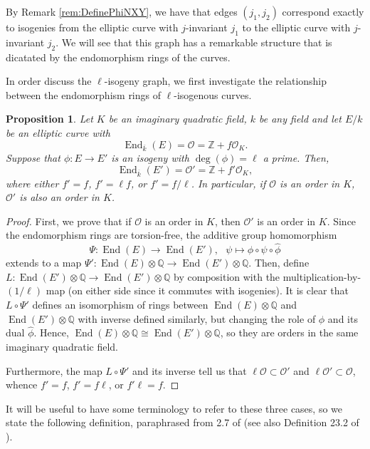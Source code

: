 \documentclass{amsart}
\newtheorem{prop}[thm]{Proposition}
\theoremstyle{definition}
\theoremstyle{remark}
\numberwithin{equation}{section}
\newcommand{\cO}{\mathcal O}
\newcommand{\bbQ}{\mathbb Q}
\newcommand{\bbZ}{\mathbb Z}
\DeclareMathOperator{\End}{End}
\begin{document}
 By Remark \ref{rem:DefinePhiNXY}, we have that edges $(j_{1}, j_{2})$ correspond exactly to isogenies from the elliptic curve with $j$-invariant $j_{1}$ to the elliptic curve with $j$-invariant $j_{2}$. We will see that this graph has a remarkable structure that is dicatated by the endomorphism rings of the curves. 
 
 In order discuss the $\ell$-isogeny graph, we first investigate the relationship between the endomorphism rings of $\ell$-isogenous curves. 
 
 \begin{prop} \label{prop:IsogeniesAffectEndRing}
 Let $K$ be an imaginary quadratic field, $k$ be any field and let $E/k$ be an elliptic curve with 
 \[
 \End_{\overline{k}}(E) = \cO = \bbZ + f \cO_{K}.
 \]
  Suppose that $\phi: E \to E'$ is an isogeny with $\deg(\phi) = \ell$ a prime. Then,
 \[
 \End_{\overline{k}}(E') = \cO' = \bbZ + f' \cO_{K},
 \]
 where either $f' = f$, $f' = \ell f$, or $f' = f/\ell$. In particular, if $\cO$ is an order in $K$, $\cO'$ is also an order in $K$.
 \end{prop}
 
 \begin{proof}
 First, we prove that if $\cO$ is an order in $K$, then $\cO'$ is an order in $K$. Since the endomorphism rings are torsion-free, the additive group homomorphism 
 \[
 \Psi: \End(E) \to \End(E'), \ \ \ \psi \mapsto \phi \circ \psi \circ \widehat{\phi}
 \]
 extends to a map $\Psi': \End(E) \otimes \bbQ \to \End(E') \otimes \bbQ$. Then, define $L: \End(E') \otimes \bbQ \to \End(E') \otimes \bbQ$ by composition with the multiplication-by-$(1/\ell)$ map (on either side since it commutes with isogenies). It is clear that $L \circ \Psi'$ defines an isomorphism of rings between $\End(E) \otimes \bbQ$ and $\End(E') \otimes \bbQ$ with inverse defined similarly, but changing the role of $\phi$ and its dual $\widehat{\phi}$. Hence, $\End(E) \otimes \bbQ \cong \End(E') \otimes \bbQ$, so they are orders in the same imaginary quadratic field.
 
 Furthermore, the map $L \circ \Psi'$ and its inverse tell us that $\ell \cO \subset \cO'$ and $\ell \cO' \subset \cO$, whence $f' = f$, $f' = f \ell$, or $f'\ell = f$.
 \end{proof}

 It will be useful to have some terminology to refer to these three cases, so we state the following definition, paraphrased from 2.7 of \cite{SutherlandIV} (see also Definition 23.2 of \cite{SutherlandLN}).
 
\end{document}
